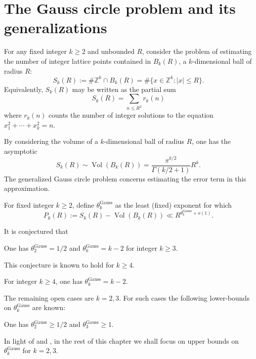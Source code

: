 \chapter{The Gauss circle problem and its generalizations}\label{gauss-circle-chapter}

\unintegrated

For any fixed integer $k \ge 2$ and unbounded $R$, consider the problem of estimating the number of integer lattice points contained in $B_k(R)$, a $k$-dimensional ball of radius $R$:
\[
S_k(R) := \# \mathbb{Z}^k \cap B_k(R) = \# \{x \in \mathbb{Z}^k: |x| \le R\}.
\]
Equivalently, $S_k(R)$ may be written as the partial sum 
\[
S_k(R) = \sum_{n \le R^{2}}r_k(n)
\]
where $r_k(n)$ counts the number of integer solutions to the equation $x_1^2 + \cdots + x_k^2 = n$.

By considering the volume of a $k$-dimensional ball of radius $R$, one has the asymptotic
\[
S_k(R) \sim \operatorname{Vol}(B_k(R)) = \frac{\pi^{k/2}}{\Gamma(k/2 + 1)}R^k.
\]
The generalized Gauss circle problem concerns estimating the error term in this approximation.

\begin{definition}
For fixed integer $k \ge 2$, define $\theta^{\operatorname{Gauss}}_{k}$ as the least (fixed) exponent for which
\[
P_k(R) := S_k(R) - \operatorname{Vol}(B_k(R)) \ll R^{\theta^{\operatorname{Gauss}}_{k} + o(1)}.
\]
\end{definition}

It is conjectured that 

\begin{conjecture}\label{gauss-circle-conj}
One has $\theta^{\operatorname{Gauss}}_{2} = 1/2$ and $\theta^{\operatorname{Gauss}}_{k} = k - 2$ for integer $k \ge 3$.
\end{conjecture}

This conjecture is known to hold for $k \ge 4$. 

\begin{theorem}
For integer $k \ge 4$, one has $\theta^{\operatorname{Gauss}}_{k} = k - 2$.
\end{theorem}

The remaining open cases are $k = 2, 3$. For such cases the following lower-bounds on $\theta^{\operatorname{Gauss}}_{k}$ are known:

\begin{theorem}\label{gauss-circle-lower-23}
One has $\theta^{\operatorname{Gauss}}_{2} \ge 1/2$ and $\theta^{\operatorname{Gauss}}_{3} \ge 1$.
\end{theorem}

In light of  and , in the rest of this chapter we shall focus on upper bounds on $\theta^{\operatorname{Gauss}}_{k}$ for $k = 2, 3$.